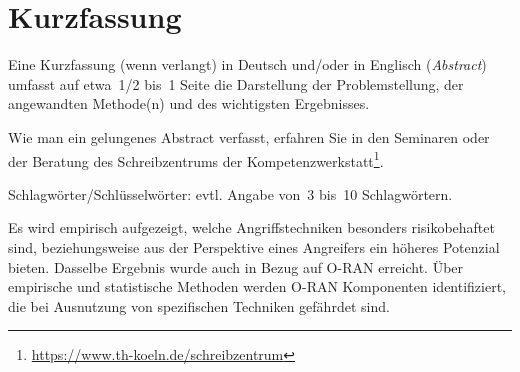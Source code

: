 \chapter*{Kurzfassung}
\label{chap:kurzfassung}
%
Eine Kurzfassung (wenn verlangt) in Deutsch und/oder in Englisch (\emph{Abstract}) umfasst auf etwa~1/2 bis~1 Seite die Darstellung der Problemstellung, der angewandten Methode(n) und des wichtigsten Ergebnisses.
\par
Wie man ein gelungenes Abstract verfasst, erfahren Sie in den Seminaren oder der Beratung des Schreibzentrums der Kompetenzwerkstatt\footnote{\href{https://www.th-koeln.de/schreibzentrum}{https://www.th-koeln.de/schreibzentrum}}.
\par
Schlagwörter/Schlüsselwörter: evtl. Angabe von~3 bis~10 Schlagwörtern.

Es wird empirisch aufgezeigt, welche Angriffstechniken besonders risikobehaftet sind, beziehungsweise aus der Perspektive eines Angreifers ein höheres Potenzial bieten. Dasselbe Ergebnis wurde auch in Bezug auf O-RAN erreicht. Über empirische und statistische Methoden werden O-RAN Komponenten identifiziert, die bei Ausnutzung von spezifischen Techniken gefährdet sind.